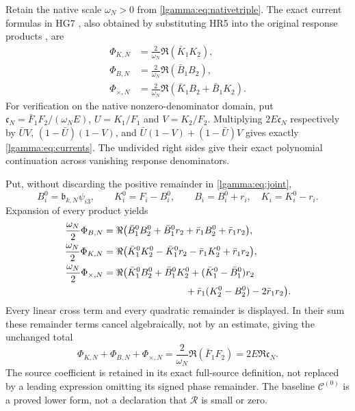 \documentclass[11pt]{article}
\begin{document}
Retain the native scale $\omega_N>0$ from \eqref{lgamma:eq:nativetriple}.
The exact current formulas in HG7 \cite{lgamma:HG}, also obtained by
substituting HR5 into the original response products \cite{lgamma:HR}, are
\begin{equation}\label{lgamma:eq:currents}
 \begin{aligned}
 \Phi_{K,N}&=\frac2{\omega_N}\Re(\bar K_1K_2),\\
 \Phi_{B,N}&=\frac2{\omega_N}\Re(\bar B_1B_2),\\
 \Phi_{\times,N}&=\frac2{\omega_N}
        \Re(\bar K_1B_2+\bar B_1K_2).
 \end{aligned}
\end{equation}
For verification on the native nonzero-denominator domain, put
$\mathfrak c_N=\bar F_1F_2/(\omega_NE)$, $U=K_1/F_1$ and
$V=K_2/F_2$.  Multiplying $2E\mathfrak c_N$ respectively by
$\bar UV$, $(1-\bar U)(1-V)$, and
$\bar U(1-V)+(1-\bar U)V$ gives exactly
\eqref{lgamma:eq:currents}.  The undivided right sides give their exact
polynomial continuation across vanishing response denominators.

Put, without discarding the positive remainder in \eqref{lgamma:eq:joint},
\[
 B_i^0=\mathfrak b_{k,N}\psi_{i3},\qquad
 K_i^0=F_i-B_i^0,\qquad B_i=B_i^0+r_i,\quad K_i=K_i^0-r_i.
\]
Expansion of every product yields
\begin{equation}\label{lgamma:eq:currentremainders}
 \begin{aligned}
 \frac{\omega_N}2\Phi_{B,N}
 &=\Re\bigl(\bar B_1^0B_2^0+\bar B_1^0r_2
              +\bar r_1B_2^0+\bar r_1r_2\bigr),\\
 \frac{\omega_N}2\Phi_{K,N}
 &=\Re\bigl(\bar K_1^0K_2^0-\bar K_1^0r_2
              -\bar r_1K_2^0+\bar r_1r_2\bigr),\\
 \frac{\omega_N}2\Phi_{\times,N}
 &=\Re\bigl(\bar K_1^0B_2^0+\bar B_1^0K_2^0
       +(\bar K_1^0-\bar B_1^0)r_2\\
 &\hspace{30mm}+\bar r_1(K_2^0-B_2^0)-2\bar r_1r_2\bigr).
 \end{aligned}
\end{equation}
Every linear cross term and every quadratic remainder is displayed.
In their sum these remainder terms cancel algebraically, not by an
estimate, giving the unchanged total
\begin{equation}\label{lgamma:eq:currenttotal}
 \Phi_{K,N}+\Phi_{B,N}+\Phi_{\times,N}
 =\frac2{\omega_N}\Re(\bar F_1F_2)
 =2E\Re\mathfrak c_N.
\end{equation}
The source coefficient is retained in its exact full-source definition,
not replaced by a leading expression omitting its signed phase remainder.
The baseline $\mathcal C^{(0)}$ is a proved lower form, not a declaration
that $\mathcal R$ is small or zero.
\end{document}
